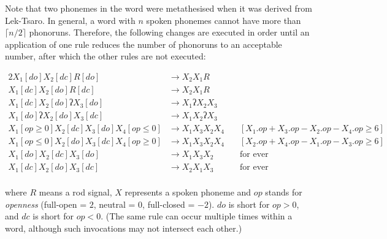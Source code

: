 \documentclass{book}
\begin{document}
\begin{center}
\end{center}

Note that two phonemes in the word were metathesised when it was derived from Lek-Tsaro. In general, a word with $n$ spoken phonemes cannot have more than $\lceil n/2 \rceil$ phonoruns. Therefore, the following changes are executed in order until an application of one rule reduces the number of phonoruns to an acceptable number, after which the other rules are not executed:

\begin{alignat*}{2}
  X_1[do] X_2[dc] R[do] &\rightarrow X_2 X_1 R \\
  X_1[dc] X_2[do] R[dc] &\rightarrow X_2 X_1 R \\
  X_1[dc] X_2[do] \text{ʔ} X_3[do] &\rightarrow X_1 \text{ʔ} X_2 X_3 \\
  X_1[do] \text{ʔ} X_2[do] X_3[dc] &\rightarrow X_1 X_2 \text{ʔ} X_3 \\
  X_1[op \ge 0] X_2[dc] X_3[do] X_4[op \le 0] &\rightarrow X_1 X_3 X_2 X_4 &\quad[X_1.op + X_3.op - X_2.op - X_4.op \ge 6] \\
  X_1[op \le 0] X_2[do] X_3[dc] X_4[op \ge 0] &\rightarrow X_1 X_3 X_2 X_4 &\quad[X_2.op + X_4.op - X_1.op - X_3.op \ge 6] \\
  X_1[do] X_2[dc] X_3[do] &\rightarrow X_1 X_3 X_2 &\quad\text{for ever} \\
  X_1[dc] X_2[do] X_3[dc] &\rightarrow X_2 X_1 X_3 &\quad\text{for ever} \\
\end{alignat*}

where $R$ means a rod signal, $X$ represents a spoken phoneme and $op$ stands for \emph{openness} (full-open = $2$, neutral = $0$, full-closed = $-2$). $do$ is short for $op > 0$, and $dc$ is short for $op < 0$. (The same rule can occur multiple times within a word, although such invocations may not intersect each other.)
\end{document}

